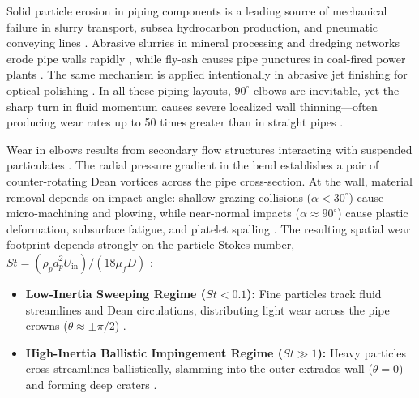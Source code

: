 \documentclass{article}
\begin{document}
Solid particle erosion in piping components is a leading source of mechanical failure in slurry transport, subsea hydrocarbon production, and pneumatic conveying lines \cite{parsi2014review,kang2024erosive,zahedi2018,othman2024integration,chen2024novel}. Abrasive slurries in mineral processing and dredging networks erode pipe walls rapidly \cite{sinha2017review,espinozajara2025,clark1992,desale2009}, while fly-ash causes pipe punctures in coal-fired power plants \cite{wang2022numerical,kang2024erosive}. The same mechanism is applied intentionally in abrasive jet finishing for optical polishing \cite{chen2017ajp}. In all these piping layouts, $90^\circ$ elbows are inevitable, yet the sharp turn in fluid momentum causes severe localized wall thinning---often producing wear rates up to 50 times greater than in straight pipes \cite{lin2015effect,chen2004cfd,yu2025ocean,mondal2022burst,mahmoudi2025erosion}.

Wear in elbows results from secondary flow structures interacting with suspended particulates \cite{clark1992,desale2009,kang2024erosive,espinozajara2025}. The radial pressure gradient in the bend establishes a pair of counter-rotating Dean vortices across the pipe cross-section. At the wall, material removal depends on impact angle: shallow grazing collisions ($\alpha < 30^\circ$) cause micro-machining and plowing, while near-normal impacts ($\alpha \approx 90^\circ$) cause plastic deformation, subsurface fatigue, and platelet spalling \cite{finnie1960erosion,bitter1963,bellman1981erosion,albukhaiti2007}. The resulting spatial wear footprint depends strongly on the particle Stokes number, $St = (\rho_p d_p^2 U_{\mathrm{in}})/(18 \mu_f D)$ \cite{hajisharifi2023non,mahmoudi2025erosion}:
\begin{itemize}
    \item \textbf{Low-Inertia Sweeping Regime ($St < 0.1$):} Fine particles track fluid streamlines and Dean circulations, distributing light wear across the pipe crowns ($\theta \approx \pm \pi/2$) \cite{espinozajara2025}.
    \item \textbf{High-Inertia Ballistic Impingement Regime ($St \gg 1$):} Heavy particles cross streamlines ballistically, slamming into the outer extrados wall ($\theta = 0$) and forming deep craters \cite{clark1992,chen2004cfd,mahmoudi2025erosion}.
\end{itemize}
\end{document}
